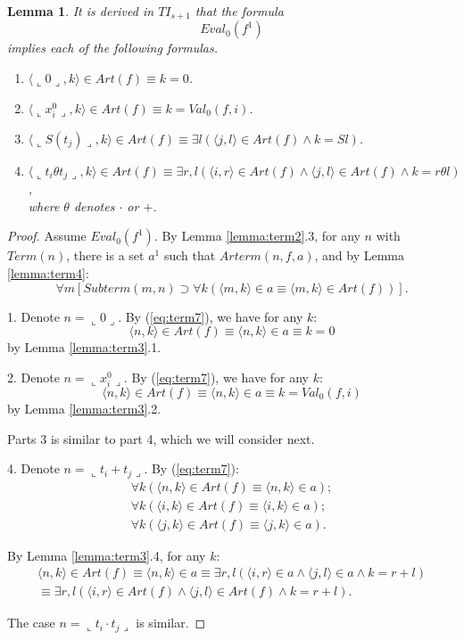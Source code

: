 \documentclass{asl}
\newtheorem{lemma}{Lemma}[section]
\theoremstyle{definition}
\begin{document}
\begin{lemma}
It is derived in $TI_{s+1}$ that the formula 
\[Eval_0(f^1)\]
implies each of the following formulas.
\begin{enumerate}
\item $\langle\llcorner 0\lrcorner,k\rangle\in Art(f)\equiv k=0$.
\medskip
\item
$\langle \llcorner x_i^0\lrcorner,k\rangle\in Art(f) \equiv k=Val_0(f,i)$.
\medskip
\item
$\langle \llcorner S(t_j)\lrcorner,k\rangle\in Art(f)\equiv 
\exists l\left(\langle j,l\rangle\in Art(f)\wedge k=Sl \right)$.
\medskip
\item
$\langle \llcorner t_i\theta t_j  \lrcorner,k\rangle\in Art(f) 
\equiv \exists r,l\left(\langle i,r\rangle\in Art(f)
\wedge \langle j,l\rangle\in Art(f)
\wedge k=r\theta l \right)$,
\\
where $\theta$ denotes $\cdot$ or $+$.
\end{enumerate}
\label{lemma:term5}
\end{lemma}
\begin{proof}
Assume $Eval_0(f^1)$. By Lemma \ref{lemma:term2}.3, for any $n$ with $Term(n)$, there is a set $a^1$ such that $Arterm(n,f,a)$, and by Lemma \ref{lemma:term4}:
\begin{equation}
\forall m\left[Subterm(m,n)\supset
\forall k\left( \langle m,k\rangle\in a
\equiv\langle m,k\rangle\in Art(f)\right)\right].
\label{eq:term7}
\end{equation}

1. Denote $n=\llcorner 0\lrcorner$. By (\ref{eq:term7}), we have for any $k$:
\[\langle n,k\rangle\in Art(f)\equiv\langle n,k\rangle\in a\equiv k=0\]
by Lemma \ref{lemma:term3}.1.

2. Denote $n=\llcorner x_i^0\lrcorner$. By (\ref{eq:term7}), we have for any $k$:
\[\langle n,k\rangle\in Art(f)\equiv\langle n,k\rangle\in a\equiv k=Val_0(f,i)\]
by Lemma \ref{lemma:term3}.2.

Parts 3 is similar to part 4, which we will consider next.

4. Denote $n=\llcorner t_i+t_j\lrcorner$. By (\ref{eq:term7}):
\begin{eqnarray*}
\forall k\left( \langle n,k\rangle\in Art(f)\equiv \langle n,k\rangle\in a\right);
\\
\forall k\left( \langle i,k\rangle\in Art(f)\equiv \langle i,k\rangle\in a\right);
\\
\forall k\left( \langle j,k\rangle\in Art(f)\equiv \langle j,k\rangle\in a\right).
\end{eqnarray*}

By Lemma \ref{lemma:term3}.4, for any $k$:
\begin{multline*}
\langle n,k\rangle\in Art(f)\equiv\langle n,k\rangle\in a
\equiv \exists r,l
\left(\langle i,r\rangle\in a
\wedge \langle j,l\rangle\in a\wedge
k=r+l\right)
\\
\equiv \exists r,l
\left(\langle i,r\rangle\in Art(f)
\wedge \langle j,l\rangle\in Art(f)\wedge
k=r+l\right).
\end{multline*}

The case $n=\llcorner t_i\cdot t_j\lrcorner$ is similar.
\end{proof}
\end{document}
